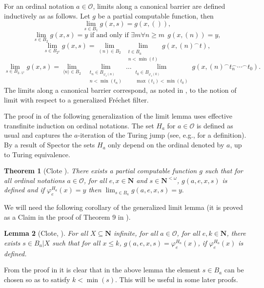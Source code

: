 \documentclass{amsart}
\theoremstyle{plain}
\theoremstyle{plain}
\newtheorem{theorem}{Theorem}
\newtheorem{lemma}[theorem]{Lemma}
\newcommand{\om}{\omega}
\newcommand\Nat{\mathbf{N}}
\newcommand\KO{\mathcal{O}}
\newcommand\conc{^\smallfrown}
\begin{document}
For an ordinal notation $a \in \mathcal{O}$, limits along a canonical barrier are defined inductively as as follows. Let $g$ be a partial computable function, then
$$ \lim_{s \in B_1} g(x,s) = g(x, ()),$$
$$ \lim_{ s \in B_2} g(x, s) = y \text{ if and only if } \exists m \forall n\geq m~~g(x,(n)) =y,$$
$$ \lim_{s\in B_{2^a}} g(x, s) = \lim_{(n) \in B_2}~ \lim_{\substack{t \in B_{a}\\ n<\min(t)}} g(x, (n)\conc t),$$
$$ \lim_{s\in B_{3\cdot 5^z}} g(x, s) = \lim_{\langle n\rangle\in B_2}~~\lim_{\substack{t_n \in B_{\varphi_z(n)} \\ n<\min(t_n)}} \ldots \lim_{\substack{t_0 \in B_{\varphi_z(0)} \\ \max(t_1)<\min(t_0)}}
g(x, (n) \conc t_n\conc \cdots \conc t_0 ).$$
The limits along a canonical barrier correspond, as noted in \cite{clote1986generalization}, to the notion of limit with respect to a generalized Fréchet filter. 

The proof in \cite{clote1986generalization} of the following generalization of the limit lemma uses effective transfinite induction on ordinal notations. The set $H_a$ for $a\in\KO$ is defined as usual and captures the $a$-iteration of the Turing jump (see, e.g., \cite{Rogers1987} for a definition). By a result of Spector \cite{Spector1955a} the sets $H_a$ only depend on the ordinal denoted by $a$, up to Turing equivalence.

\begin{theorem}[Clote \cite{clote1986generalization}]\label{CloteGenLimit}
There exists a partial computable function $g$ such that for all ordinal notations $a\in\mathcal{O}$, for all $e, x \in \Nat$
and $s \in \Nat^{<\om}$, $g(a,e,x,s)$ is defined and if $\varphi_e^{H_a}(x)= y$ then 
$\lim_{s \in B_a} g(a,e,x,s) = y.$
\end{theorem}

We will need the following corollary of the generalized limit lemma (it is proved as a Claim in the proof of Theorem 9 in \cite{Clote1984}).

\begin{lemma}[Clote, \cite{Clote1984}]\label{lem:clote}
For all $X\subseteq\Nat$ infinite, 
for all $a \in \mathcal{O}$,
for all $e,k \in \Nat$, there exists $s \in B_a\vert X$ such that for all $x\leq k$, 
$g(a,e,x,s)= \varphi_e^{H_a}(x)$, if $\varphi_e^{H_a}(x)$ is defined. 
\end{lemma}

From the proof in \cite{clote1986generalization} it is clear that in the above lemma the element $s\in B_a$ can be chosen so as to satisfy $k < \min(s)$. This will be useful in some later proofs. 
\end{document}
